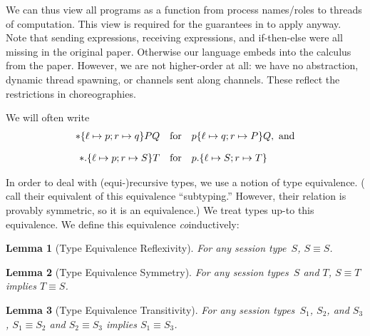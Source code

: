 \documentclass{article}
\newtheorem{lem}{Lemma}
\theoremstyle{definition}
\newcommand{\subst}[3]{#1~[#2 \mapsto #3]}
\begin{document}
\begin{syntax}
    \alternative{\PiEnd}
  \category[Programs]{\Pi,\cdots}
\end{syntax}
We can thus view all programs as a function from process names/roles to threads of computation.
This view is required for the guarantees in \citet{ScalasY19} to apply anyway.
Note that sending expressions, receiving expressions, and if-then-else were all missing in the original paper.
Otherwise our language embeds into the calculus from the paper.
However, we are not higher-order at all: we have no abstraction, dynamic thread spawning, or channels sent along channels.
These reflect the restrictions in choreographies.

We will often write $$
\begin{array}{rcl}
  *\{\ell \mapsto p; r \mapsto q\}{P}{Q}&\text{for}&p\{\ell \mapsto q; r \mapsto P\}{Q},~\text{and}\\[1em]
  *.\{\ell \mapsto p ; r \mapsto S\}{T}&\text{for}&p.\{\ell \mapsto S ; r \mapsto T\}
\end{array}
$$

In order to deal with (equi-)recursive types, we use a notion of type equivalence.
(\citet{ScalasY19} call their equivalent of this equivalence ``subtyping.''
However, their relation is provably symmetric, so it is an equivalence.)
We treat types up-to this equivalence.
We define this equivalence \emph{co}inductively:
\begin{lem}[Type Equivalence Reflexivity]
  \label{lem:type-refl}
  For any session type~$S$, $S \equiv S$.
\end{lem}
\begin{lem}[Type Equivalence Symmetry]
  \label{lem:type-sym}
  For any session types~$S$ and $T$, $S \equiv T$ implies $T \equiv S$.
\end{lem}
\begin{lem}[Type Equivalence Transitivity]
  \label{lem:type-trans}
  For any session types~$S_1$, $S_2$, and $S_3$, $S_1 \equiv S_2$ and $S_2 \equiv S_3$ implies $S_1 \equiv S_3$.
\end{lem}
\end{document}
